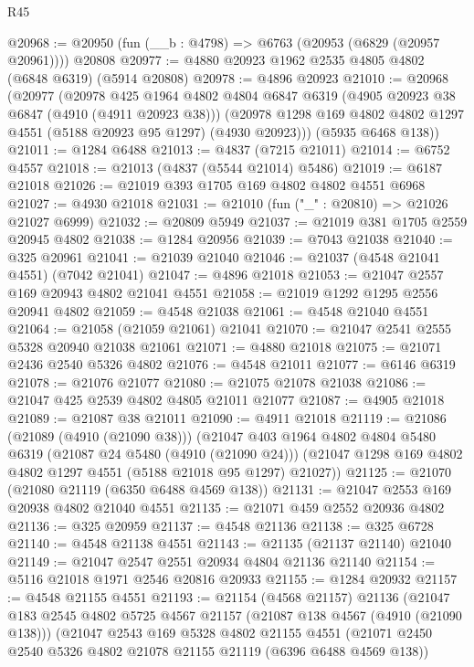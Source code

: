 \begin{lexlean}{R45}
\begin{coremodule}
@20968 := @20950 (fun (__b : @4798) => @6763 (@20953 (@6829 (@20957 @20961)))) @20808
@20977 := @4880 @20923 @1962 @2535 @4805 @4802 (@6848 @6319) (@5914 @20808)
@20978 := @4896 @20923
@21010 := @20968
    (@20977
      (@20978
        @425
        @1964
        @4802
        @4804
        @6847
        @6319
        (@4905 @20923 @38 @6847 (@4910 (@4911 @20923 @38)))
        (@20978 @1298 @169 @4802 @4802 @1297 @4551 (@5188 @20923 @95 @1297) (@4930 @20923)))
      (@5935 @6468 @138))
@21011 := @1284 @6488
@21013 := @4837 (@7215 @21011)
@21014 := @6752 @4557
@21018 := @21013 (@4837 (@5544 @21014) @5486)
@21019 := @6187 @21018
@21026 := @21019 @393 @1705 @169 @4802 @4802 @4551 @6968
@21027 := @4930 @21018
@21031 := @21010 (fun ("_" : @20810) => @21026 @21027 @6999)
@21032 := @20809 @5949
@21037 := @21019 @381 @1705 @2559 @20945 @4802
@21038 := @1284 @20956
@21039 := @7043 @21038
@21040 := @325 @20961
@21041 := @21039 @21040
@21046 := @21037 (@4548 @21041 @4551) (@7042 @21041)
@21047 := @4896 @21018
@21053 := @21047 @2557 @169 @20943 @4802 @21041 @4551
@21058 := @21019 @1292 @1295 @2556 @20941 @4802
@21059 := @4548 @21038
@21061 := @4548 @21040 @4551
@21064 := @21058 (@21059 @21061) @21041
@21070 := @21047 @2541 @2555 @5328 @20940 @21038 @21061
@21071 := @4880 @21018
@21075 := @21071 @2436 @2540 @5326 @4802
@21076 := @4548 @21011
@21077 := @6146 @6319
@21078 := @21076 @21077
@21080 := @21075 @21078 @21038
@21086 := @21047 @425 @2539 @4802 @4805 @21011 @21077
@21087 := @4905 @21018
@21089 := @21087 @38 @21011
@21090 := @4911 @21018
@21119 := @21086
    (@21089 (@4910 (@21090 @38)))
    (@21047
      @403
      @1964
      @4802
      @4804
      @5480
      @6319
      (@21087 @24 @5480 (@4910 (@21090 @24)))
      (@21047 @1298 @169 @4802 @4802 @1297 @4551 (@5188 @21018 @95 @1297) @21027))
@21125 := @21070 (@21080 @21119 (@6350 @6488 @4569 @138))
@21131 := @21047 @2553 @169 @20938 @4802 @21040 @4551
@21135 := @21071 @459 @2552 @20936 @4802
@21136 := @325 @20959
@21137 := @4548 @21136
@21138 := @325 @6728
@21140 := @4548 @21138 @4551
@21143 := @21135 (@21137 @21140) @21040
@21149 := @21047 @2547 @2551 @20934 @4804 @21136 @21140
@21154 := @5116 @21018 @1971 @2546 @20816 @20933
@21155 := @1284 @20932
@21157 := @4548 @21155 @4551
@21193 := @21154
    (@4568 @21157)
    @21136
    (@21047
      @183
      @2545
      @4802
      @5725
      @4567
      @21157
      (@21087 @138 @4567 (@4910 (@21090 @138)))
      (@21047
        @2543
        @169
        @5328
        @4802
        @21155
        @4551
        (@21071 @2450 @2540 @5326 @4802 @21078 @21155 @21119 (@6396 @6488 @4569 @138))

\end{coremodule}
\end{lexlean}
